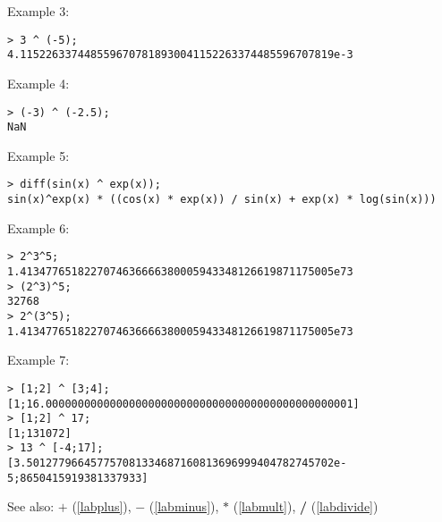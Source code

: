 \noindent Example 3: 
\begin{center}\begin{minipage}{15cm}\begin{Verbatim}[frame=single]
> 3 ^ (-5);
4.1152263374485596707818930041152263374485596707819e-3
\end{Verbatim}
\end{minipage}\end{center}
\noindent Example 4: 
\begin{center}\begin{minipage}{15cm}\begin{Verbatim}[frame=single]
> (-3) ^ (-2.5);
NaN
\end{Verbatim}
\end{minipage}\end{center}
\noindent Example 5: 
\begin{center}\begin{minipage}{15cm}\begin{Verbatim}[frame=single]
> diff(sin(x) ^ exp(x));
sin(x)^exp(x) * ((cos(x) * exp(x)) / sin(x) + exp(x) * log(sin(x)))
\end{Verbatim}
\end{minipage}\end{center}
\noindent Example 6: 
\begin{center}\begin{minipage}{15cm}\begin{Verbatim}[frame=single]
> 2^3^5;
1.4134776518227074636666380005943348126619871175005e73
> (2^3)^5;
32768
> 2^(3^5);
1.4134776518227074636666380005943348126619871175005e73
\end{Verbatim}
\end{minipage}\end{center}
\noindent Example 7: 
\begin{center}\begin{minipage}{15cm}\begin{Verbatim}[frame=single]
> [1;2] ^ [3;4];
[1;16.000000000000000000000000000000000000000000000001]
> [1;2] ^ 17;
[1;131072]
> 13 ^ [-4;17];
[3.501277966457757081334687160813696999404782745702e-5;8650415919381337933]
\end{Verbatim}
\end{minipage}\end{center}
See also: \textbf{$+$} (\ref{labplus}), \textbf{$-$} (\ref{labminus}), \textbf{$*$} (\ref{labmult}), \textbf{/} (\ref{labdivide})
